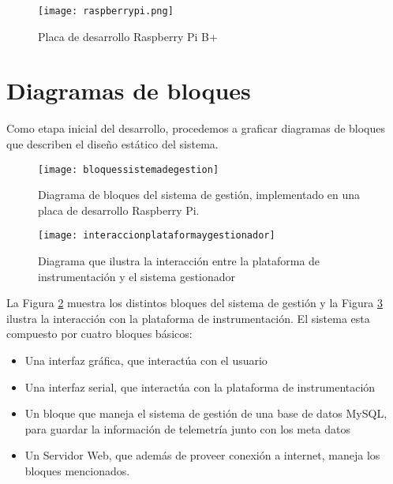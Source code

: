 \begin{figure}[h]
  \centering
  \texttt{[image: raspberrypi.png]}
  \caption{Placa de desarrollo Raspberry Pi B+}\label{fig:raspberrypi}
\end{figure}

\section{Diagramas de bloques} %
\label{it7:sec:diagramas_de_bloques}

Como etapa inicial del desarrollo, procedemos a graficar diagramas de bloques que describen el diseño estático del sistema.

\begin{figure}[h]
  \centering
  \texttt{[image: bloquessistemadegestion]}
  \caption{Diagrama de bloques del sistema de gestión, implementado en una placa de desarrollo Raspberry Pi.}\label{fig:bloquessistemadegestion}
\end{figure}

\begin{figure}[h]
  \centering
  \texttt{[image: interaccionplataformaygestionador]}
  \caption{Diagrama que ilustra la interacción entre la plataforma de instrumentación y el sistema gestionador}\label{fig:interaccionplataformaygestionador}
\end{figure}

La Figura \ref{fig:bloquessistemadegestion} muestra los distintos bloques del sistema de gestión y la Figura \ref{fig:interaccionplataformaygestionador} ilustra la interacción con la plataforma de instrumentación. El sistema esta compuesto por cuatro bloques básicos:

\begin{itemize}
  \item Una interfaz gráfica, que interactúa con el usuario
  \item Una interfaz serial, que interactúa con la plataforma de instrumentación
  \item Un bloque que maneja el sistema de gestión de una base de datos MySQL, para guardar la información de telemetría junto con los meta datos
  \item Un Servidor Web, que además de proveer conexión a internet, maneja los bloques mencionados.
\end{itemize}


